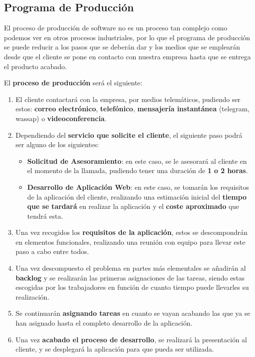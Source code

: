 \subsection{Programa de Producción}
El proceso de producción de software no es un proceso tan complejo como podemos ver en otros procesos industriales, por lo que el programa de producción se puede reducir a los pasos que se deberán dar y los medios que se emplearán desde que el cliente se pone en contacto con nuestra empresa hasta que se entrega el producto acabado.

El \textbf{proceso de producción} será el siguiente:

\begin{enumerate}
    \item El cliente contactará con la empresa, por medios telemáticos, pudiendo ser estos: \textbf{correo electrónico}, \textbf{telefónico}, \textbf{mensajería instantánea} (telegram, wassap) o \textbf{videoconferencia}.

    \item Dependiendo del \textbf{servicio que solicite el cliente}, el siguiente paso podrá ser alguno de los siguientes:
    \begin{itemize}
        \item \textbf{Solicitud de Asesoramiento}: en este caso, se le asesorará al cliente en el momento de la llamada, pudiendo tener una duración de \textbf{1 o 2 horas}.

        \item \textbf{Desarrollo de Aplicación Web}: en este caso, se tomarán los requisitos de la aplicación del cliente, realizando una estimación inicial del \textbf{tiempo que se tardará} en realizar la aplicación y el \textbf{coste aproximado} que tendrá esta.
    \end{itemize}

    \item Una vez recogidos los \textbf{requisitos de la aplicación}, estos se descompondrán en elementos funcionales, realizando una reunión con equipo para llevar este paso a cabo entre todos.

    \item Una vez descompuesto el problema en partes más elementales se añadirán al \textbf{backlog} y se realizarán las primeras asignaciones de las tareas, siendo estas escogidas por los trabajadores en función de cuanto tiempo puede llevarles su realización.

    \item Se continuarán \textbf{asignando tareas} en cuanto se vayan acabando las que ya se han asignado hasta el completo desarrollo de la aplicación.

    \item Una vez \textbf{acabado el proceso de desarrollo}, se realizará la presentación al cliente, y se desplegará la aplicación para que pueda ser utilizada.
\end{enumerate}


